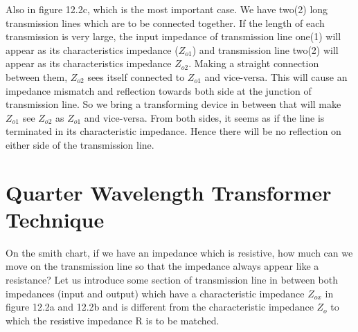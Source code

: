  Also in figure 12.2c, which is the most important case. We have two(2) long transmission lines which are to be connected together. If the length of each transmission is very large, the input impedance of transmission line one(1) will appear as its characteristics impedance ($ Z_{o1}$) and transmission line two(2) will appear as its characteristics impedance $ Z_{o2}$. Making a straight connection between them,  $ Z_{o2}$ sees itself connected to $ Z_{o1}$ and vice-versa. This will cause an impedance mismatch and reflection towards both side at the junction of transmission line. So we bring a transforming device in between that will make  $Z_{o1}$ see $Z_{o2}$ as $Z_{o1}$ and vice-versa. From both sides, it seems as if the line is terminated in its characteristic impedance. Hence there will be no reflection on either side of the transmission line.\\
\section{Quarter Wavelength Transformer Technique}

 On the smith chart, if we have an impedance which is resistive, how much can we move on the transmission line so that the impedance always appear like a resistance? Let us introduce some section of transmission line in between both impedances (input and output) which have a characteristic impedance $ Z_{ox}$ in figure 12.2a and 12.2b  and is different from the characteristic impedance  $ Z_o$ to which the resistive impedance R is to be matched.\\
	
